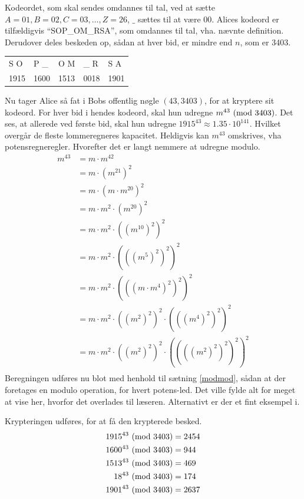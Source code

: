 \begin{eks}
    Kodeordet, som skal sendes omdannes til tal, ved at sætte \(A=01, B=02, C=03, \hdots , Z=26\), \(\_\) sættes til at være 00.
    Alices kodeord er tilfældigvis ``SOP\_OM\_RSA'', som omdannes til tal, vha. nævnte definition.
    Derudover deles beskeden op, sådan at hver bid, er mindre end \(n\), som er 3403.
    \begin{center}
        \begin{tabular}{l l l l l}
            S O  & P \_  & O M  & \_ R  & S A\\
            1915 & 1600  & 1513  & 0018   & 1901\\
        \end{tabular}
    \end{center}

    Nu tager Alice så fat i Bobs offentlig nøgle \((43, 3403)\), for at kryptere sit kodeord.
    For hver bid i hendes kodeord, skal hun udregne \(m^{43} \ (\mathrm{mod}\ 3403)\).
    Det ses, at allerede ved første bid, skal hun udregne \(1915^{43} \approx 1.35 \cdot 10^{141}\).
    Hvilket overgår de fleste lommeregneres kapacitet.
    Heldigvis kan \(m^{43}\) omskrives, vha potensregneregler. Hvorefter det er langt nemmere at udregne modulo.
    \begin{align*}
        m^{43} &= m \cdot m^{42}\\
        &= m \cdot (m^{21})^2\\
        &= m \cdot (m \cdot m^{20})^2\\
        &= m \cdot m^2 \cdot (m^{20})^2\\
        &= m \cdot m^2 \cdot ((m^{10})^2)^2\\
        &= m \cdot m^2 \cdot (((m^5)^2)^2)^2\\
        &= m \cdot m^2 \cdot (((m \cdot m^4)^2)^2)^2\\
        &= m \cdot m^2 \cdot ((m^2)^2)^2 \cdot (((m^4)^2)^2)^2\\
        &= m \cdot m^2 \cdot ((m^2)^2)^2 \cdot ((((m^2)^2)^2)^2)^2\\
    \end{align*}
    Beregningen udføres nu blot med henhold til sætning \ref{modmod}, sådan at der foretages en modulo operation, for hvert potens-led.
    Det ville fylde alt for meget at vise her, hvorfor det overlades til læseren. Alternativt er der et fint eksempel i. \cite[104]{krypto}
    \par
    Krypteringen udføres, for at få den krypterede besked.
    \begin{align*}
        1915^{43} \ (\mathrm{mod}\ 3403) &= 2454\\
        1600^{43} \ (\mathrm{mod}\ 3403) &= 944\\
        1513^{43} \ (\mathrm{mod}\ 3403) &= 469\\
        18^{43} \ (\mathrm{mod}\ 3403)   &= 174\\
        1901^{43} \ (\mathrm{mod}\ 3403) &= 2637\\
    \end{align*}


\end{eks}
